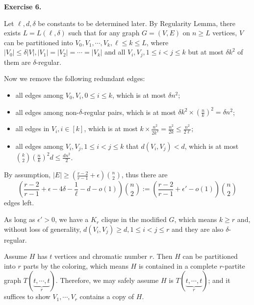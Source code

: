 \documentclass[a4paper]{article}
\newenvironment{exercise}[1]{
	\par
	\noindent\textbf{Exercise #1.}\quad
}{
	\par
	\bigskip
}
\newcommand{\pbra}[1]{\left( #1 \right)}
\begin{document}
\begin{exercise}{6}
    Let $\ell,d,\delta$ be constants to be determined later. 
    By Regularity Lemma, there exists $L=L(\ell,\delta)$ such that for any graph $G=(V,E)$ on $n\geq L$ vertices, $V$ can be 
    partitioned into $V_0,V_1,\cdots,V_k,\ell\leq k\leq L$, where $|V_0|\leq\delta|V|,|V_1|=|V_2|=\cdots=|V_k|$ and 
    all $V_i,V_j,1\leq i<j\leq k$ but at most $\delta k^2$ of them are $\delta$-regular.

    Now we remove the following redundant edges:
    \begin{itemize}
        \item all edges among $V_0,V_i,0\leq i\leq k$, which is at most $\delta n^2$;
        \item all edges among non-$\delta$-regular pairs, which is at most $\delta k^2\times\pbra{\frac nk}^2=\delta n^2$;
        \item all edges in $V_i,i\in[k]$, which is at most $k\times\frac{n^2}{2k^2}=\frac{n^2}{2k}\leq\frac{n^2}{2\ell}$;
        \item all edges among $V_i,V_j,1\leq i<j\leq k$ that $d(V_i,V_j)<d$, which is at most 
            $\binom k2\pbra{\frac nk}^2d\leq\frac{dn^2}2$.
    \end{itemize}
    By assumption, $|E|\geq\pbra{\frac{r-2}{r-1}+\epsilon}\binom n2$, thus there are
    $$
    \pbra{\frac{r-2}{r-1}+\epsilon-4\delta-\frac1\ell-d-o(1)}\binom n2
    :=\pbra{\frac{r-2}{r-1}+\epsilon'-o(1)}\binom n2
    $$
    edges left.

    As long as $\epsilon'>0$, we have a $K_r$ clique in the modified $G$, which means $k\geq r$ and, without loss of generality,
    $d(V_i,V_j)\geq d,1\leq i<j\leq r$ and they are also $\delta$-regular.

    Assume $H$ has $t$ vertices and chromatic number $r$. Then $H$ can be partitioned into $r$ parts by the coloring, which means
    $H$ is contained in a complete $r$-partite graph $T(\underbrace{t,\cdots,t}_r)$. Therefore, we may safely assume $H$ is 
    $T(\underbrace{t,\cdots,t}_r)$; and it suffices to show $V_1,\cdots,V_r$ contains a copy of $H$.


\end{exercise}
\end{document}
